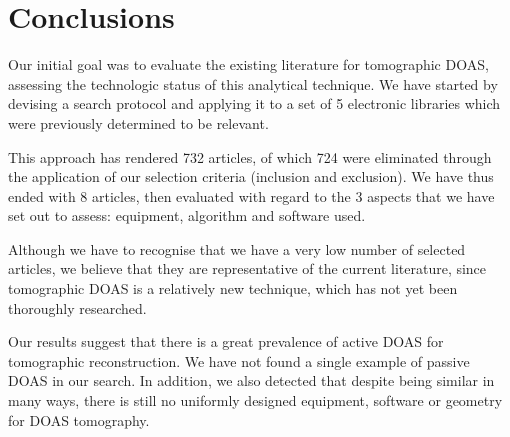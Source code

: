 \section{Conclusions}
\label{sec:conclusions}

Our initial goal was to evaluate the existing literature for tomographic
DOAS, assessing the technologic status of this analytical technique. We
have started by devising a search protocol and applying it to a set of
5 electronic libraries which were previously determined to be relevant.

This approach has rendered 732 articles, of which 724 were eliminated
through the application of our selection criteria (inclusion and
exclusion). We have thus ended with 8 articles, then evaluated with
regard to the 3 aspects that we have set out to assess: equipment,
algorithm and software used.

Although we have to recognise that we have a very low number of selected
articles, we believe that they are representative of the current
literature, since tomographic DOAS is a relatively new technique, which
has not yet been thoroughly researched.

Our results suggest that there is a great prevalence of active DOAS for
tomographic reconstruction. We have not found a single example of
passive DOAS in our search. In addition, we also detected that despite
being similar in many ways, there is still no uniformly designed
equipment, software or geometry for DOAS tomography.

